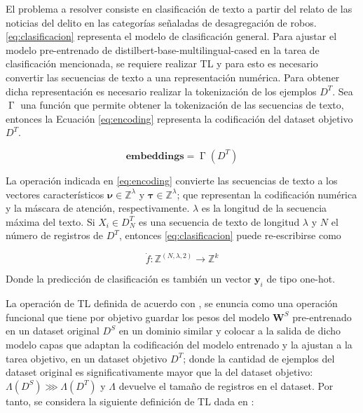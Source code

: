 \documentclass[onecolumn, journal, english, 12pt, a4paper]{IEEEtran} %
\DeclareMathOperator{\ypredsource}{\phi^{S}}
\DeclareMathOperator{\Tokenization}{\Gamma}
\theoremstyle{definition}
\begin{document}
El problema a resolver consiste en clasificación de texto a partir del relato de las noticias del delito en las categorías señaladas de desagregación de robos. \eqref{eq:clasificacion} representa el modelo de clasificación general. Para ajustar el modelo pre-entrenado de distilbert-base-multilingual-cased en la tarea de clasificación mencionada, se requiere realizar TL y para esto es necesario convertir las secuencias de texto a una representación numérica. Para obtener dicha representación es necesario realizar la tokenización de los ejemplos $D^T$. Sea $\Tokenization$ una función que permite obtener la tokenización de las secuencias de texto, entonces la Ecuación \ref{eq:encoding} representa la codificación del dataset objetivo $D^T$.



\begin{equation}\label{eq:encoding}
    \mathbf{embeddings} = \Tokenization(D^T)
\end{equation}

La operación indicada en \eqref{eq:encoding} convierte las secuencias de texto a los vectores característicos  $\boldsymbol{\nu} \in \mathbb{Z}^{\lambda}$ y $\boldsymbol{\tau} \in \mathbb{Z}^\lambda$; que representan la codificación numérica y la máscara de atención, respectivamente. $\lambda$ es la longitud de la secuencia máxima del texto. Si $X_i \in D^T_{N}$ es una secuencia de texto de longitud $\lambda$ y $N$ el número de registros de $D^T$, entonces \eqref{eq:clasificacion} puede re-escribirse como

\begin{equation}\label{eq: tensorflowin}
    \dot{f}: \mathbb{Z}^{(N,\lambda,2)} \longrightarrow \mathbb{Z}^k
\end{equation}

Donde la predicción de clasificación es también un vector $\boldsymbol{y}_i$ de tipo one-hot. 

La operación de TL definida de acuerdo con \textcite{falconi2020transfer}, se enuncia como una operación funcional que tiene por objetivo guardar los pesos del modelo $\boldsymbol{W}^S$ pre-entrenado en un dataset original $D^S$ en un dominio similar y colocar a la salida de dicho modelo capas que adaptan la codificación del modelo entrenado y la ajustan a la tarea objetivo, en un dataset objetivo $D^T$; donde la cantidad de ejemplos del dataset original es significativamente mayor que la del dataset objetivo: $\Lambda(D^S) \ggg \Lambda(D^T)$ y $\Lambda$ devuelve el tamaño de registros en el dataset. Por tanto, se considera la siguiente definición de TL dada en \cite{falconi2020transfer}:
\end{document}
